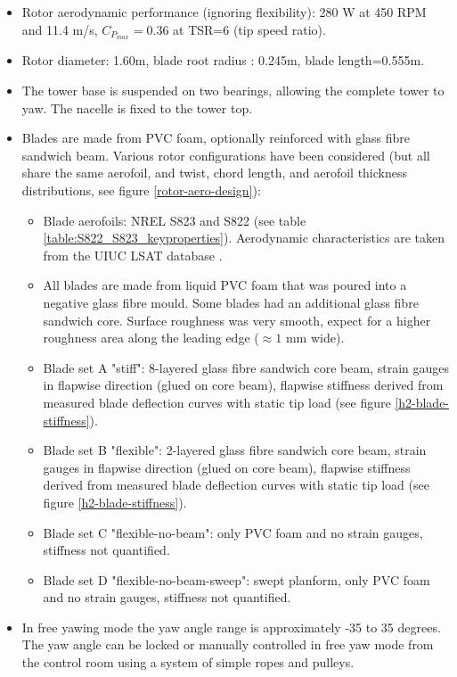 \documentclass[a4paper]{jpconf}
\begin{document}
\begin{itemize}
	\item Rotor aerodynamic performance (ignoring flexibility): 280 W at 450 RPM and 11.4 m/s, $C_{P_{max}}=0.36$ at TSR=6 (tip speed ratio).
	\item Rotor diameter: 1.60m, blade root radius : 0.245m, blade length=0.555m.
	\item The tower base is suspended on two bearings, allowing the complete tower to yaw. The nacelle is fixed to the tower top.
	\item Blades are made from PVC foam, optionally reinforced with glass fibre sandwich beam. Various rotor configurations have been considered (but all share the same aerofoil, and twist, chord length, and aerofoil thickness distributions, see figure \ref{rotor-aero-design}):
	\begin{itemize}
		\item Blade aerofoils: NREL S823 and S822 \cite{somers_s822_2005} (see table \ref{table:S822_S823_keyproperties}). Aerodynamic characteristics are taken from the UIUC LSAT database \cite{selig_summary_1996}.
		\item All blades are made from liquid PVC foam that was poured into a negative glass fibre mould. Some blades had an additional glass fibre sandwich core. Surface roughness was very smooth, expect for a higher roughness area along the leading edge ($\approx 1$ mm wide).
		\item Blade set A "stiff": 8-layered glass fibre sandwich core beam, strain gauges in flapwise direction (glued on core beam), flapwise stiffness derived from measured blade deflection curves with static tip load (see figure \ref{h2-blade-stiffness}).
		\item Blade set B "flexible": 2-layered glass fibre sandwich core beam, strain gauges in flapwise direction (glued on core beam), flapwise stiffness derived from measured blade deflection curves with static tip load (see figure \ref{h2-blade-stiffness}).
		\item Blade set C "flexible-no-beam": only PVC foam and no strain gauges, stiffness not quantified.
		\item Blade set D "flexible-no-beam-sweep": swept planform, only PVC foam and no strain gauges, stiffness not quantified.
	\end{itemize}
	\item In free yawing mode the yaw angle range is approximately -35 to 35 degrees. The yaw angle can be locked or manually controlled in free yaw mode from the control room using a system of simple ropes and pulleys.

\end{itemize}
\end{document}
